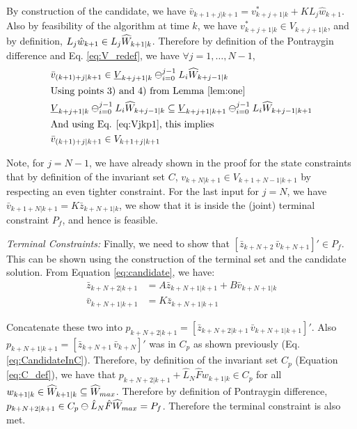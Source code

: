 By construction of the candidate, we have $\bar{v}_{k+1+j|k+1}=v^{*}_{k+j+1|k}+KL_j\hat{w}_{k+1}$. Also by feasibility of the algorithm at time $k$, we have $v^{*}_{k+j+1|k} \in V_{k+j+1|k}$, and by definition, $L_j\hat{w}_{k+1} \in L_j\widehat{W}_{k+1|k}$. Therefore by definition of the Pontraygin difference and Eq. \ref{eq:V_redef}, we have $\forall j=1,\dotsc,N-1$,
\begin{subequations}
\begin{align}
&\bar{v}_{(k+1)+j|k+1} \in \underline{V}_{k+j+1|k} \ominus_{i=0}^{j-1}L_i\widehat{W}_{k+j-1|k} \\
&\text{Using points 3) and 4) from Lemma \ref{lem:one}} \nonumber \\
&\underline{V}_{k+j+1|k} \ominus_{i=0}^{j-1}L_i\widehat{W}_{k+j-1|k} \subseteq \underline{V}_{k+j+1|k+1} \ominus_{i=0}^{j-1}L_i\widehat{W}_{k+j-1|k+1} \\
&\text{And using Eq. \ref{eq:Vjkp1}, this implies} \nonumber \\
&\bar{v}_{(k+1)+j|k+1} \in V_{k+1+j|k+1}
\end{align}
\end{subequations}

Note,  for $j=N-1$, we have already shown in the proof for the state constraints that by definition of the invariant set $C$, $v_{k+N|k+1} \in {V}_{k+1+N-1|k+1}$ by respecting an even tighter constraint.
For the last input for $j=N$, we have $\bar{v}_{k+1+N|k+1}=K\bar{z}_{k+N+1|k}$, we show that it is inside the (joint) terminal constraint $P_f$, and hence is feasible.

\textit{Terminal Constraints:} Finally, we need to show that $[\bar{z}_{k+N+2} \, \bar{v}_{k+N+1}]' \in P_f$. This can be shown using the construction of the terminal set and the candidate solution. From Equation \ref{eq:candidate}, we have:
\begin{subequations}
\begin{align}
\bar{z}_{k+N+2|k+1}&=A\bar{z}_{k+N+1|k+1} + B\bar{v}_{k+N+1|k} \\
\bar{v}_{k+N+1|k+1}&=K\bar{z}_{k+N+1|k+1}
\end{align}
\end{subequations}

Concatenate these two into $p_{k+N+2|k+1} = [\bar{z}_{k+N+2|k+1}\, \bar{v}_{k+N+1|k+1}]'$. Also $p_{k+N+1|k+1} = [\bar{z}_{k+N+1} \,\bar{v}_{k+N}]'$ was in $C_p$ as shown previously (Eq. \ref{eq:CandidateInC}). Therefore, by definition of the invariant set $C_p$ (Equation \ref{eq:C_def}), we have that $p_{k+N+2|k+1} + \hat{L}_N \hat{F} w_{k+1|k}\in C_p$ for all $w_{k+1|k}\in \widehat{W}_{k+1|k} \subseteq \widehat{W}_{max}$. Therefore by definition of Pontraygin difference, $p_{k+N+2|k+1} \in C_p \ominus \hat{L}_N\hat{F}\widehat{W}_{max} = P_f$. Therefore the terminal constraint is also met.

